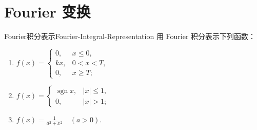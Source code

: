 \section{Fourier 变换}

\begin{problem}{Fourier积分表示}{Fourier-Integral-Representation}
    用 Fourier 积分表示下列函数：
    \begin{enumerate}
        \item $f(x) = \begin{cases} 0, & x \leqslant 0, \\ kx, & 0 < x < T, \\ 0, & x \geqslant T; \end{cases}$
        \item $f(x) = \begin{cases} \operatorname{sgn} x, & |x| \leqslant 1, \\ 0, & |x| > 1; \end{cases}$
        \item $f(x) = \frac{1}{a^2+x^2} \quad (a > 0)$.
    \end{enumerate}
\end{problem}

